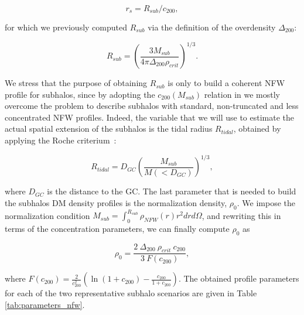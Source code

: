 \documentclass[%
 reprint,
nofootinbib,
 amsmath,amssymb,
 aps,
]{revtex4-2}
\begin{document}
\begin{equation}\label{eqn:scale radius}
r_s = R_{sub}/c_{200},
\end{equation}

\noindent for which we previously computed $R_{sub}$ via the definition of the overdensity $\Delta_{200}$:

\begin{equation}\label{eqn:vitual_virial_radius}
R_{sub}=\left(\frac{3 M_{sub}}{4\pi \Delta_{200}\rho_{crit}}\right)^{1/3}.
\end{equation}

We stress that the purpose of obtaining $R_{sub}$ is only to build a coherent NFW profile for subhalos, since by adopting the $c_{200}(M_{sub})$ relation in \cite{Moline+17} we mostly overcome the problem to describe subhalos with standard, non-truncated and less concentrated NFW profiles. Indeed, the variable that we will use to estimate the actual spatial extension of the subhalos is the tidal radius $R_{tidal}$, obtained by applying the Roche criterium~\cite{1962AJ.....67..471K}:

\begin{equation}
R_{tidal}= D_{GC} \left( \frac{M_{sub}}{M (<D_{GC})} \right)^{1/3},
\label{eqn:roche_crit}
\end{equation}

\noindent where $D_{GC}$ is the distance to the GC. The last parameter that is needed to build the subhalos DM density profiles is the normalization density, $\rho_0$. We impose the normalization condition $M_{sub}=\int_0^{R_{sub}}\rho_{NFW}(r)r^2drd\Omega$, and rewriting this in terms of the concentration parameters, we can finally compute $\rho_0$ as

\begin{equation}\label{eqn:density_norm}
\rho_0 = \frac{2~\Delta_{200}~\rho_{crit}~c_{200}}{3~F(c_{200})},
\end{equation}

\noindent where $F(c_{200})=\frac{2}{c_{200}^2}\left(\ln{(1+c_{200})}-\frac{c_{200}}{1+c_{200}}\right)$. The obtained profile parameters for each of the two representative subhalo scenarios are given in Table \ref{tab:parameters_nfw}. %
\end{document}
